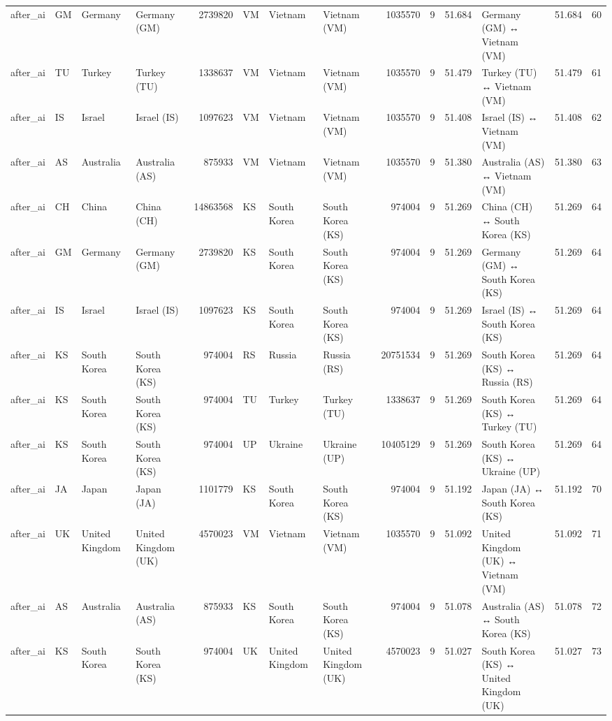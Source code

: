 \begin{tabular}{llllrlllrrrlrr}
after\_ai & GM & Germany & Germany (GM) & 2739820 & VM & Vietnam & Vietnam (VM) & 1035570 & 9 & 51.684 & Germany (GM) ↔ Vietnam (VM) & 51.684 & 60 \\
after\_ai & TU & Turkey & Turkey (TU) & 1338637 & VM & Vietnam & Vietnam (VM) & 1035570 & 9 & 51.479 & Turkey (TU) ↔ Vietnam (VM) & 51.479 & 61 \\
after\_ai & IS & Israel & Israel (IS) & 1097623 & VM & Vietnam & Vietnam (VM) & 1035570 & 9 & 51.408 & Israel (IS) ↔ Vietnam (VM) & 51.408 & 62 \\
after\_ai & AS & Australia & Australia (AS) & 875933 & VM & Vietnam & Vietnam (VM) & 1035570 & 9 & 51.380 & Australia (AS) ↔ Vietnam (VM) & 51.380 & 63 \\
after\_ai & CH & China & China (CH) & 14863568 & KS & South Korea & South Korea (KS) & 974004 & 9 & 51.269 & China (CH) ↔ South Korea (KS) & 51.269 & 64 \\
after\_ai & GM & Germany & Germany (GM) & 2739820 & KS & South Korea & South Korea (KS) & 974004 & 9 & 51.269 & Germany (GM) ↔ South Korea (KS) & 51.269 & 64 \\
after\_ai & IS & Israel & Israel (IS) & 1097623 & KS & South Korea & South Korea (KS) & 974004 & 9 & 51.269 & Israel (IS) ↔ South Korea (KS) & 51.269 & 64 \\
after\_ai & KS & South Korea & South Korea (KS) & 974004 & RS & Russia & Russia (RS) & 20751534 & 9 & 51.269 & South Korea (KS) ↔ Russia (RS) & 51.269 & 64 \\
after\_ai & KS & South Korea & South Korea (KS) & 974004 & TU & Turkey & Turkey (TU) & 1338637 & 9 & 51.269 & South Korea (KS) ↔ Turkey (TU) & 51.269 & 64 \\
after\_ai & KS & South Korea & South Korea (KS) & 974004 & UP & Ukraine & Ukraine (UP) & 10405129 & 9 & 51.269 & South Korea (KS) ↔ Ukraine (UP) & 51.269 & 64 \\
after\_ai & JA & Japan & Japan (JA) & 1101779 & KS & South Korea & South Korea (KS) & 974004 & 9 & 51.192 & Japan (JA) ↔ South Korea (KS) & 51.192 & 70 \\
after\_ai & UK & United Kingdom & United Kingdom (UK) & 4570023 & VM & Vietnam & Vietnam (VM) & 1035570 & 9 & 51.092 & United Kingdom (UK) ↔ Vietnam (VM) & 51.092 & 71 \\
after\_ai & AS & Australia & Australia (AS) & 875933 & KS & South Korea & South Korea (KS) & 974004 & 9 & 51.078 & Australia (AS) ↔ South Korea (KS) & 51.078 & 72 \\
after\_ai & KS & South Korea & South Korea (KS) & 974004 & UK & United Kingdom & United Kingdom (UK) & 4570023 & 9 & 51.027 & South Korea (KS) ↔ United Kingdom (UK) & 51.027 & 73 \\

\end{tabular}
